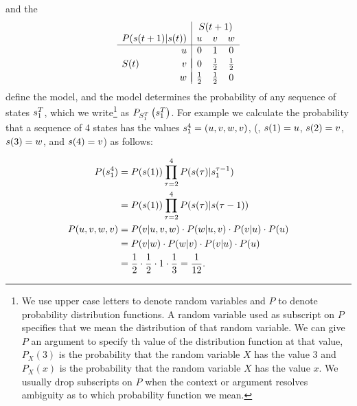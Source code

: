 and the  %
%
\begin{equation}
  \label{eq:TransitionMatrix}
\begin{array}{rr|ccc}
  && \multicolumn{3}{c}{\ti{S}{t+1}} \\
  \multicolumn{2}{c|}{P(\ti{s}{t+1}|\ti{s}{t})} & u & v & w \\ \hline
  & u & 0 & 1 & 0 \\  && \vspace{-1 em} \\
  \ti{S}{t} & v & 0 & \frac{1}{2} & \frac{1}{2} \\  && \vspace{-0.98 em} \\
  & w & \frac{1}{2} & \frac{1}{2} & 0
\end{array}
\end{equation}
define the model, and the model determines the probability of any
sequence of states $s_{1}^{T}$, which we write\footnote{We use
  upper case letters to denote random variables and $P$ to denote
  probability distribution functions.  A random variable used as
  subscript on $P$ specifies that we mean the distribution of that
  random variable.  We can give $P$ an argument to specify th value of
  the distribution function at that value, \eg $P_X(3)$ is the
  probability that the random variable $X$ has the value 3 and $P_X(x)$
  is the probability that the random variable $X$ has the value $x$.
  We usually drop subscripts on $P$ when the context or argument
  resolves ambiguity as to which probability function we mean.} as
$P_{S_{1}^{T}}\left( s_{1}^{T} \right)$.  For example we
calculate the probability that a sequence of 4 states has the values
$s_{1}^{4} = (u,v,w,v)$, (\ie, ${s}{(1)} = u$, ${s}{(2)} = v$,
${s}{(3)} = w$, and ${s}{(4)} = v$) as follows:

\begin{align}
  \label{eq:intro_hmm1}
  P(\ts{s}{1}{4}) &= P(\ti{s}{1}) \prod_{\tau=2}^4 %
                     P(\ti{s}{\tau}|\ts{s}{1}{\tau-1})\\
  \label{eq:intro_hmm2}
                  &= P(\ti{s}{1}) \prod_{\tau=2}^4 %
                     P(\ti{s}{\tau}|\ti{s}{\tau-1}) \\
  \label{eq:intro_hmm3}
  P(u,v,w,v)      &= P(v|u,v,w) \cdot P(w|u,v) \cdot  P(v|u) \cdot P(u)\\
  \label{eq:intro_hmm4}
        &= P(v|w) \cdot P(w|v) \cdot  P(v|u) \cdot P(u)\\
  \label{eq:intro_hmm5}
        &= \frac{1}{2} \cdot \frac{1}{2} \cdot 1 %
                     \cdot \frac{1}{3} = \frac{1}{12}.
\end{align}


